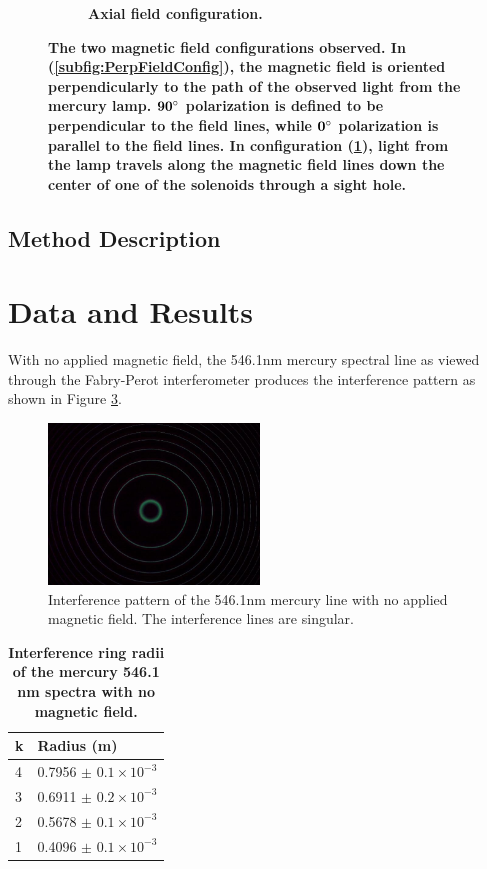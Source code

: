 \documentclass[twocolumn]{article}
\begin{document}
\begin{figure}
\begin{subfigure}{0.55\textwidth}
			\caption{\textbf{Axial field configuration.}}
			\label{subfig:AxialFieldConfig}
		\end{subfigure}%
		\caption{\textbf{The two magnetic field configurations observed. In (\ref{subfig:PerpFieldConfig}), the magnetic field is oriented perpendicularly to the path of the observed light from the mercury lamp. $\mathbf{90\degree}$ polarization is defined to be perpendicular to the field lines, while $\mathbf{0\degree}$ polarization is parallel to the field lines. In configuration (\ref{subfig:AxialFieldConfig}), light from the lamp travels along the magnetic field lines down the center of one of the solenoids through a sight hole.}}
		\label{fig:FieldConfig}
	\end{figure}
	
	\subsection{Method Description} \label{subsec:MethodDescription}
	
\section{Data and Results} \label{sec:DataAndResults}
	 
	 With no applied magnetic field, the 546.1nm mercury spectral line as viewed through the Fabry-Perot interferometer produces the interference pattern as shown in Figure \ref{fig:B=0Pattern}.
	 
	 \begin{figure}
		\centering
		\includegraphics[width=0.5\textwidth]{Images/B=0Pattern}
		\caption{Interference pattern of the 546.1nm mercury line with no applied magnetic field. The interference lines are singular.}
		\label{fig:B=0Pattern}
	\end{figure}
 
	 \begin{table}[h]
	 	\centering
	 	\begin{tabular}{l|l}
	 		k & Radius (m) \\ \hline
	 		4 & 0.7956 $\pm$ $0.1\times10^{-3}$    \\
	 		3 & 0.6911 $\pm$ $0.2\times10^{-3}$    \\
	 		2 & 0.5678 $\pm$ $0.1\times10^{-3}$    \\
	 		1 & 0.4096 $\pm$ $0.1\times10^{-3}$   
	 	\end{tabular}
	 	\caption{\textbf{Interference ring radii of the mercury 546.1 nm spectra with no magnetic field.}}
	 	\label{tab:B0Data}
	 	
	 \end{table}
\end{document}
